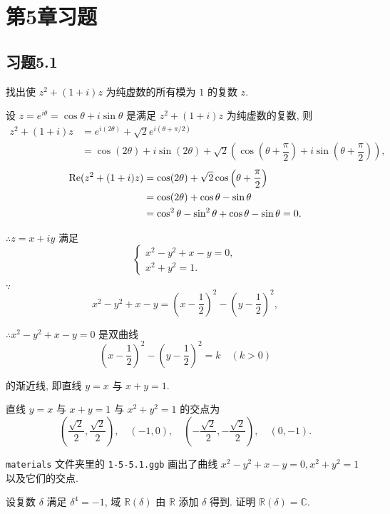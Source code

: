\documentclass[color=black,device=normal,lang=cn,mode=geye]{elegantnote}
\begin{document}
\section{第5章习题}
\subsection{习题5.1}
\begin{exercise}%
    找出使 $z^2+(1+i)z$ 为纯虚数的所有模为 $1$ 的复数 $z$.
\end{exercise}
\begin{solution}
    设 $z=e^{i\theta}=\cos\theta+i\sin\theta$ 是满足 $z^2+(1+i)z$ 为纯虚数的复数, 则
    \begin{align*}
        z^2+(1+i)z & =e^{i(2\theta)}+\sqrt{2}e^{i(\theta+\pi/2)} \\
        & =\cos(2\theta)+i\sin(2\theta)+\sqrt{2}\left(\cos\left(\theta+\dfrac{\pi}{2}\right)+i\sin\left(\theta+\dfrac{\pi}{2}\right)\right),
    \end{align*}
    \begin{align*}
        \operatorname{Re}(z^2+(1+i)z) & =\cos(2\theta)+\sqrt{2}\cos\left(\theta+\dfrac{\pi}{2}\right) \\
        & =\cos(2\theta)+\cos\theta-\sin\theta \\
        & =\cos^2\theta-\sin^2\theta+\cos\theta-\sin\theta=0.
    \end{align*}
    
    $\therefore z=x+iy$ 满足
    \[\begin{cases}
        x^2-y^2+x-y=0, \\
        x^2+y^2=1.
    \end{cases}\]

    $\because$
    \[x^2-y^2+x-y=\left(x-\dfrac{1}{2}\right)^2-\left(y-\dfrac{1}{2}\right)^2,\]

    $\therefore x^2-y^2+x-y=0$ 是双曲线
    \[\left(x-\dfrac{1}{2}\right)^2-\left(y-\dfrac{1}{2}\right)^2=k\quad(k>0)\]

    的渐近线, 即直线 $y=x$ 与 $x+y=1$.

    直线 $y=x$ 与 $x+y=1$ 与 $x^2+y^2=1$ 的交点为
    \[\left(\dfrac{\sqrt{2}}{2},\dfrac{\sqrt{2}}{2}\right),\quad(-1,0),\quad\left(-\dfrac{\sqrt{2}}{2},-\dfrac{\sqrt{2}}{2}\right),\quad(0,-1).\]

    \verb|materials| 文件夹里的 \verb|1-5-5.1.ggb| 画出了曲线 $x^2-y^2+x-y=0,x^2+y^2=1$ 以及它们的交点.
\end{solution}
\begin{exercise}%
    设复数 $\delta$ 满足 $\delta^4=-1$, 域 $\mathbb{R}(\delta)$ 由 $\mathbb{R}$ 添加 $\delta$ 得到. 证明 $\mathbb{R}(\delta)=\mathbb{C}$.
\end{exercise}
\end{document}
